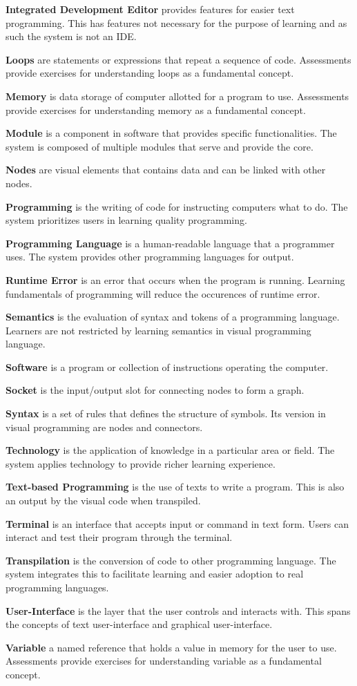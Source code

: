 \parx
\textbf{Integrated Development Editor} provides features for easier text programming.
This has features not necessary for the purpose of learning and as such the system
is not an IDE.

\parx
\textbf{Loops} are statements or expressions that repeat a sequence of code.
Assessments provide exercises for understanding loops as a fundamental concept.

\parx
\textbf{Memory} is data storage of computer allotted for a program to use.
Assessments provide exercises for understanding memory as a fundamental concept.

\parx
\textbf{Module} is a component in software that provides specific functionalities.
The system is composed of multiple modules that serve and provide the core.

\parx
\textbf{Nodes} are visual elements that contains data and can be linked with other nodes.

\parx
\textbf{Programming} is the writing of code for instructing computers what to do.
The system prioritizes users in learning quality programming.

\parx
\textbf{Programming Language} is a human-readable language that a programmer uses.
The system provides other programming languages for output.

\parx
\textbf{Runtime Error} is an error that occurs when the program is running.
Learning fundamentals of programming will reduce the occurences of runtime error.

\parx
\textbf{Semantics} is the evaluation of syntax and tokens of a programming language.
Learners are not restricted by learning semantics in visual programming language.

\parx
\textbf{Software} is a program or collection of instructions operating the computer.

\parx
\textbf{Socket} is the input/output slot for connecting nodes to form a graph.

\parx
\textbf{Syntax} is a set of rules that defines the structure of symbols.
Its version in visual programming are nodes and connectors.

\parx
\textbf{Technology} is the application of knowledge in a particular area or field.
The system applies technology to provide richer learning experience.

\parx
\textbf{Text-based Programming} is the use of texts to write a program.
This is also an output by the visual code when transpiled.

\parx
\textbf{Terminal} is an interface that accepts input or command in text form.
Users can interact and test their program through the terminal.

\parx
\textbf{Transpilation} is the conversion of code to other programming language.
The system integrates this to facilitate learning and easier adoption to real
programming languages.

\parx
\textbf{User-Interface} is the layer that the user controls and interacts with.
This spans the concepts of text user-interface and graphical user-interface.

\parx
\textbf{Variable} a named reference that holds a value in memory for the user to use.
Assessments provide exercises for understanding variable as a fundamental concept.
